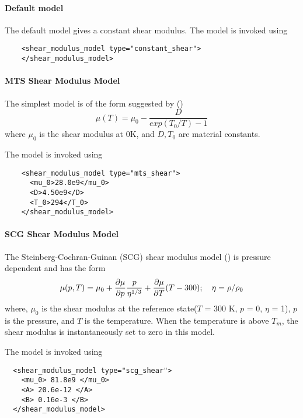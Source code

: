   \paragraph{Default model}
  The default model gives a constant shear modulus.  The model is 
  invoked using
  \begin{verbatim}
    <shear_modulus_model type="constant_shear">
    </shear_modulus_model>
  \end{verbatim}

  \paragraph{MTS Shear Modulus Model}
  The simplest model is of the form suggested by \cite{Varshni70} 
  (\cite{Chen96})
  \begin{equation} \label{eq:MTSShear}
    \mu(T) = \mu_0 - \frac{D}{exp(T_0/T) - 1}
  \end{equation}
  where $\mu_0$ is the shear modulus at 0K, and $D, T_0$ are material
  constants. 

  The model is invoked using
  \begin{verbatim}
    <shear_modulus_model type="mts_shear">
      <mu_0>28.0e9</mu_0>
      <D>4.50e9</D>
      <T_0>294</T_0>
    </shear_modulus_model>
  \end{verbatim}

  \paragraph{SCG Shear Modulus Model}
  The Steinberg-Cochran-Guinan (SCG) shear modulus 
  model (\cite{Steinberg80,Zocher00}) is pressure dependent and
  has the form
  \begin{equation} \label{eq:SCGShear}
    \mu(p,T) = \mu_0 + \Partial{\mu}{p} \frac{p}{\eta^{1/3}} +
         \Partial{\mu}{T}(T - 300) ; \quad
    \eta = \rho/\rho_0
  \end{equation}
  where, $\mu_0$ is the shear modulus at the reference state($T$ = 300 K, 
  $p$ = 0, $\eta$ = 1), $p$ is the pressure, and $T$ is the temperature.
  When the temperature is above $T_m$, the shear modulus is instantaneously
  set to zero in this model.

  The model is invoked using
  \begin{verbatim}
  <shear_modulus_model type="scg_shear">
    <mu_0> 81.8e9 </mu_0>
    <A> 20.6e-12 </A>
    <B> 0.16e-3 </B>
  </shear_modulus_model>
  \end{verbatim}

